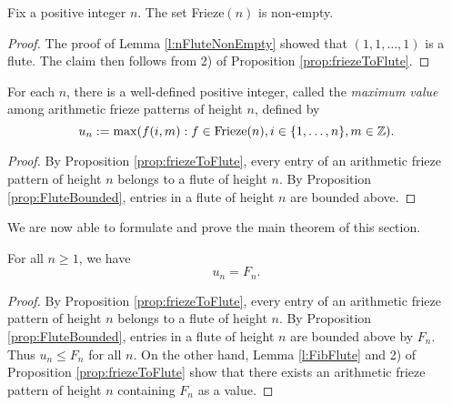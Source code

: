 \begin{corollary}
    \label{c:friezeNonEmpty}
    Fix a positive integer $n$. The set Frieze$(n)$ is non-empty.
\end{corollary}
\begin{proof}
    The proof of Lemma \ref{l:nFluteNonEmpty} showed that $(1,1,\ldots, 1)$ is a flute. 
    The claim then follows from 2) of Proposition \ref{prop:friezeToFlute}.
\end{proof}

\begin{corollary}
    \label{l:maxDefined}
    For each $n$, there is a well-defined
    positive integer, called the {\it maximum value} among arithmetic frieze patterns of height $n$, defined by
    \[
        u_n := \max ( f (i,m) : f \in  {\rm Frieze}(n), i \in \{1,\ldots, n\}, m \in \mathbb{Z}).
    \]
\end{corollary}
\begin{proof}
    By Proposition \ref{prop:friezeToFlute}, every entry of an arithmetic frieze pattern of height $n$ belongs to a flute of height $n$.
    By Proposition \ref{prop:FluteBounded}, entries in a flute of height $n$ are bounded above.
\end{proof}


We are now able to formulate and prove the main theorem of this section.
\begin{theorem}
    \label{mainTheorem}
    For all $n \geq 1$, we have 
    \[
        u_n = F_{n}.
    \]    
\end{theorem}
\begin{proof}
    By Proposition \ref{prop:friezeToFlute}, every entry of an arithmetic frieze pattern of height $n$ belongs to a flute of height $n$.
    By Proposition \ref{prop:FluteBounded}, entries in a flute of height $n$ are bounded above by $F_n$. Thus $u_n \leq F_n$ for all $n$. 
On the other hand, Lemma \ref{l:FibFlute} and 2) of Proposition \ref{prop:friezeToFlute} show that 
there exists an arithmetic frieze pattern of height $n$ containing $F_n$ as a value.
\end{proof}